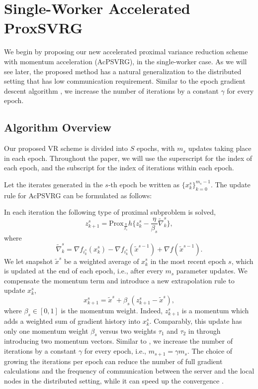 \documentclass[conference]{IEEEtran}
\newcommand*{\Po}{\text{Prox}}
\theoremstyle{definition}
\theoremstyle{remark}
\begin{document}
\section{Single-Worker Accelerated ProxSVRG}

We begin by proposing our new accelerated proximal variance reduction scheme with momentum acceleration (AcPSVRG), in the single-worker case. 
As we will see later, the proposed method has a natural generalization to the distributed setting that has low communication requirement. Similar to the epoch gradient descent algorithm \cite{Hazan2011}, we increase the number of iterations by a constant $\gamma$ for every epoch. 

\subsection{Algorithm Overview}

Our proposed VR scheme is divided into $S$ epochs, with $m_s$ updates taking place in each epoch.  Throughout the paper, we will
use the superscript for the index of each epoch, and the subscript for the index of iterations within each epoch.

Let the iterates generated in the $s$-th epoch be written as $\{x_k^s\}_{k=0}^{m_s-1}$. The update rule for AcPSVRG can be formulated as follows: 

In each iteration the following type of proximal subproblem is solved,
\begin{equation}
z_{k+1}^s = \Po_{\frac{\eta}{\beta_s}} h \{z_{k}^s - \frac{\eta}{\beta_s}\widetilde{\nabla}_k^s\},
\end{equation}
where
\begin{equation}\label{nabla-update}
\widetilde{\nabla}_k^s = \nabla f_{i_k^s}(x_k^s) - \nabla f_{i_k^s}(\widetilde{x}^{s-1}) + \nabla f(\widetilde{x}^{s-1}).
\end{equation}
We let snapshot $\widetilde{x}^s$ be a weighted average of $x_k^{s}$ in the most recent epoch $s$, which is updated at the end of each epoch, i.e., after every $m_s$ parameter updates. We compensate the momentum term and introduce a new extrapolation rule to update $x_k^{s}$,
\[
x_{k+1}^s = \widetilde{x}^s+\beta_s(z_{k+1}^s-\widetilde{x}^s),
\]
where $\beta_s \in [0, 1]$ is the momentum weight. Indeed, $z_{k+1}^s$ is a momentum which adds a weighted sum of gradient history into $x_k^{s}$. Comparably, this update has only one momentum weight $\beta_s$ versus two weights $\tau_1$ and $\tau_2$ in \cite{Allen-Zhu17} through introducing two momentum vectors.  
Similar to \cite{Hazan2011}, we increase the number of
iterations by a constant $\gamma$ for every epoch, i.e., $m_{s+1} = \gamma m_{s}$.
The choice of growing the iterations per epoch can reduce the number of full gradient calculations and the frequency of communication between
the server and the local nodes in the distributed setting, while it can speed up the convergence \cite{Allen-Zhu2016I}.
\end{document}
